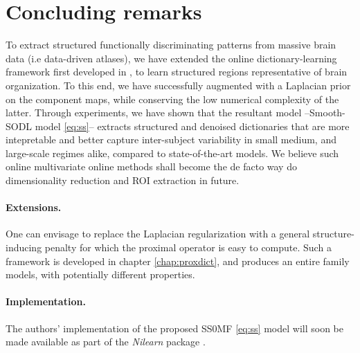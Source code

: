 \section{Concluding remarks}
To extract structured functionally discriminating patterns
from massive brain data (i.e data-driven atlases), we have extended
the online dictionary-learning framework first developed in
  \citep{mairal2010}, to learn structured regions
representative of brain organization. To this end, we have successfully augmented   \citep{mairal2010} with a Laplacian prior on the component maps,
while conserving the low numerical complexity of the latter.
Through experiments, we have shown that the resultant model --Smooth-SODL model \eqref{eq:ss}-- extracts structured and denoised dictionaries that are more intepretable and better capture inter-subject variability in small medium, and large-scale regimes alike, compared to state-of-the-art models.
We believe such online multivariate online methods shall become the de facto
way do dimensionality reduction and ROI extraction in future.

\paragraph{Extensions.} One can envisage to replace the Laplacian regularization with a general structure-inducing penalty for which the proximal operator is easy to compute. Such a framework is developed in chapter \ref{chap:proxdict}, and produces an entire family models, with potentially different properties.


\paragraph{Implementation.} The authors' implementation of the proposed
SS0MF \eqref{eq:ss} model will soon be made available as part of the
\textit{Nilearn} package   \citep{nilearn}.







